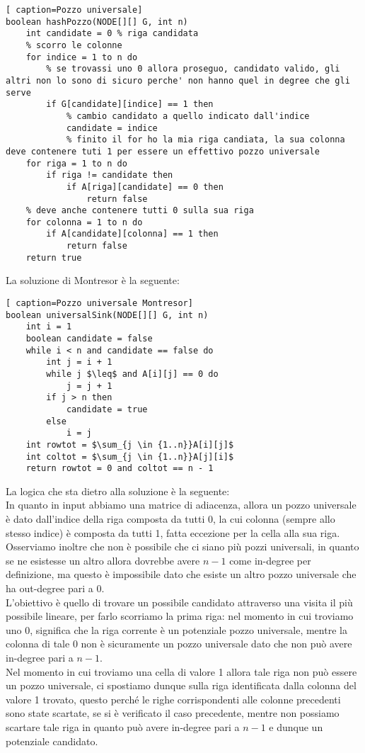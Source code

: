 \documentclass[../cheatSheetAlgoritmi.tex]{subfiles}
\begin{document}
\begin{lstlisting}[ caption=Pozzo universale]
boolean hashPozzo(NODE[][] G, int n)
	int candidate = 0 % riga candidata
  	% scorro le colonne
  	for indice = 1 to n do
  		% se trovassi uno 0 allora proseguo, candidato valido, gli altri non lo sono di sicuro perche' non hanno quel in degree che gli serve
    	if G[candidate][indice] == 1 then
      		% cambio candidato a quello indicato dall'indice
      		candidate = indice
  			% finito il for ho la mia riga candiata, la sua colonna deve contenere tuti 1 per essere un effettivo pozzo universale
  	for riga = 1 to n do
    	if riga != candidate then
      		if A[riga][candidate] == 0 then
        		return false
  	% deve anche contenere tutti 0 sulla sua riga
  	for colonna = 1 to n do
  		if A[candidate][colonna] == 1 then
    		return false
  	return true
\end{lstlisting}
La soluzione di Montresor è la seguente:
\begin{lstlisting}[ caption=Pozzo universale Montresor]
boolean universalSink(NODE[][] G, int n)
	int i = 1
  	boolean candidate = false
  	while i < n and candidate == false do
    	int j = i + 1
    	while j $\leq$ and A[i][j] == 0 do
      		j = j + 1
    	if j > n then
      		candidate = true
    	else
      		i = j
  	int rowtot = $\sum_{j \in {1..n}}A[i][j]$
  	int coltot = $\sum_{j \in {1..n}}A[j][i]$
  	return rowtot = 0 and coltot == n - 1
\end{lstlisting}
La logica che sta dietro alla soluzione è la seguente: \\
In quanto in input abbiamo una matrice di adiacenza, allora un pozzo universale è dato dall'indice della riga composta da tutti 0, la cui colonna (sempre allo stesso indice) è composta da tutti 1, fatta eccezione per la cella alla sua riga. \\ Osserviamo inoltre che non è possibile che ci siano più pozzi universali, in quanto se ne esistesse un altro allora dovrebbe avere $n-1$ come in-degree per definizione, ma questo è impossibile dato che esiste un altro pozzo universale che ha out-degree pari a 0.\\
 L'obiettivo è quello di trovare un possibile candidato attraverso una visita il più possibile lineare, per farlo scorriamo la prima riga: nel momento in cui troviamo uno 0, significa che la riga corrente è un potenziale pozzo universale, mentre la colonna di tale 0 non è sicuramente un pozzo universale dato che non può avere in-degree pari a $n-1$. \\
Nel momento in cui troviamo una cella di valore 1 allora tale riga non può essere un pozzo universale, ci spostiamo dunque sulla riga identificata dalla colonna del valore 1 trovato, questo perché le righe corrispondenti alle colonne precedenti sono state scartate, se si è verificato il caso precedente, mentre non possiamo scartare tale riga in quanto può avere in-degree pari a $n-1$ e dunque un potenziale candidato.\\
\end{document}
